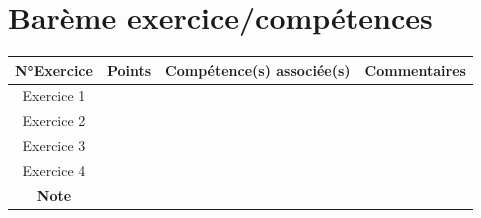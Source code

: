 \documentclass[11pt,a4paper]{article}
\begin{document}
\section*{Barème exercice/compétences}
\begin{tcolorbox}[colback=white,colframe=black,title=Critères de réussite]
\renewcommand{\arraystretch}{1.3}
\setlength{\extrarowheight}{0,3cm}
\begin{tabularx}{\linewidth}{|c|c|X|X|}
\hline
\textbf{N°Exercice} & \textbf{Points} & \textbf{Compétence(s) associée(s)}& Commentaires\\
\hline
Exercice 1 &  &
&
\\ 
\hline
Exercice 2 &  &%
&
\\
\hline
Exercice 3 &  &
&
\\
\hline
Exercice 4 &  & 
&
\\
\hline
\textbf{Note} &
\multicolumn{3}{c|}{\textbf{} 
}
\\
\hline
\end{tabularx}

\end{tcolorbox}

\newpage

    
\end{document}
